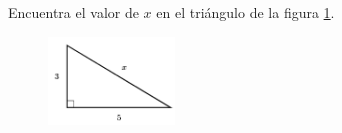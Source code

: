 \question[15]  Encuentra el valor de $x$ en el triángulo de la figura \ref{fig:lados_pitagoras_14}.
\begin{figure}[H]
    \begin{center}
        \includegraphics[width=0.3\textwidth]{../images/lados_pitagoras_14.png}
    \end{center}
    \caption{}
    \label{fig:lados_pitagoras_14}
\end{figure}